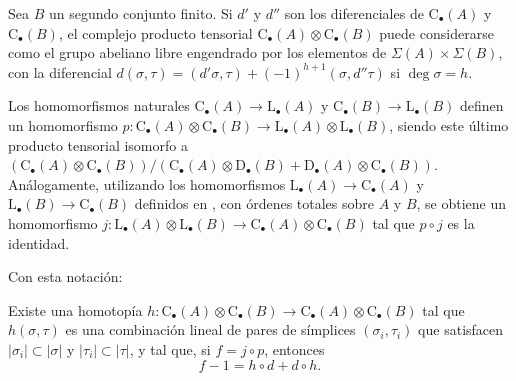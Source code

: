 \begin{env}[11.8.2]
\label{0.11.8.2}
\label{0.11.8.2-fr}
Sea $B$ un segundo conjunto finito.
Si $d'$ y $d''$ son los diferenciales de
$\mathrm C_\bullet(A)$ y $\mathrm C_\bullet(B)$, el complejo producto
tensorial
$\mathrm C_\bullet(A)\otimes\mathrm C_\bullet(B)$
puede considerarse como el grupo abeliano libre engendrado por los elementos de
$\Sigma(A)\times\Sigma(B)$, con la diferencial $d(\sigma,\tau)=(d'\sigma,\tau)+(-1)^{h+1}(\sigma,d''\tau)$ si $\deg\sigma=h$.

Los homomorfismos naturales
$\mathrm C_\bullet(A)\to\mathrm L_\bullet(A)$ y
$\mathrm C_\bullet(B)\to\mathrm L_\bullet(B)$ definen un homomorfismo
$p:\mathrm C_\bullet(A)\otimes\mathrm C_\bullet(B)\longrightarrow\mathrm L_\bullet(A)\otimes\mathrm L_\bullet(B)$,
siendo este último producto tensorial isomorfo a
$(\mathrm C_\bullet(A)\otimes\mathrm C_\bullet(B))/(\mathrm C_\bullet(A)\otimes\mathrm D_\bullet(B)+\mathrm D_\bullet(A)\otimes\mathrm C_\bullet(B))$.
Análogamente, utilizando los homomorfismos
$\mathrm L_\bullet(A)\to\mathrm C_\bullet(A)$ y
$\mathrm L_\bullet(B)\to\mathrm C_\bullet(B)$ definidos en
, con órdenes totales sobre $A$ y $B$, se obtiene un
homomorfismo
$j:\mathrm L_\bullet(A)\otimes\mathrm L_\bullet(B)\longrightarrow\mathrm C_\bullet(A)\otimes\mathrm C_\bullet(B)$
tal que $p\circ j$ es la identidad.
\end{env}

Con esta notación:
\begin{proposition}[11.8.3]
\label{0.11.8.3}
\label{0.11.8.3-fr}
Existe una homotopía
$h:\mathrm C_\bullet(A)\otimes\mathrm C_\bullet(B)\longrightarrow\mathrm C_\bullet(A)\otimes\mathrm C_\bullet(B)$
tal que $h(\sigma,\tau)$ es una combinación lineal de pares de símplices
$(\sigma_i,\tau_i)$ que satisfacen
$|\sigma_i|\subset|\sigma|$ y $|\tau_i|\subset|\tau|$, y tal que,
si $f=j\circ p$, entonces
\[
\label{0.11.8.3.1-fr}
\tag{11.8.3.1}
f-1=h\circ d+d\circ h.
\]
\end{proposition}

